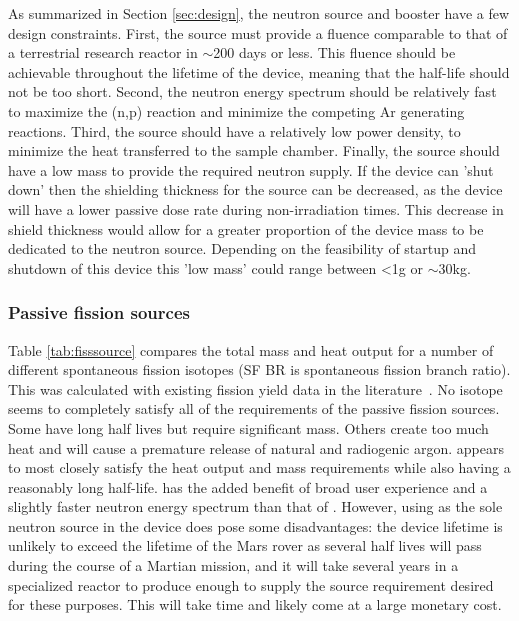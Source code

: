 \documentclass{mc2015}
\begin{document}
As summarized in Section \ref{sec:design}, the neutron source and booster have a few design constraints. First, the source must provide a fluence comparable to that of a terrestrial research reactor in $\sim$200 days or less. This fluence should be achievable throughout the lifetime of the device, meaning that the half-life should not be too short. Second, the neutron energy spectrum should be relatively fast to maximize the (n,p) reaction and minimize the competing Ar generating reactions. Third, the source should have a relatively low power density, to minimize the heat transferred to the sample chamber. Finally, the source should have a low mass to provide the required neutron supply. If the device can 'shut down' then the shielding thickness for the source can be decreased, as the device will have a lower passive dose rate during non-irradiation times. This decrease in shield thickness would allow for a greater proportion of the device mass to be dedicated to the neutron source. Depending on the feasibility of startup and shutdown of this device this 'low mass' could range between <1g or $\sim$30kg. 

\subsubsection{Passive fission sources}

Table \ref{tab:fisssource} compares the total mass and heat output for a number of different spontaneous fission isotopes (SF BR is spontaneous fission branch ratio). This was calculated with existing fission yield data in the literature~\cite{england_evaluation_1995, axton_neutron_1985}.
No isotope seems to completely satisfy all of the requirements of the passive fission sources. Some have long half lives but require significant mass. Others create too much heat and will cause a premature release of natural and radiogenic argon.  appears to most closely satisfy the heat output and mass requirements while also having a reasonably long half-life.  has the added benefit of broad user experience \cite{martin_production_2000} and a slightly faster neutron energy spectrum than that of  \cite{hjalmar_energy_1955}. However, using  as the sole neutron source in the device does pose some disadvantages: the device lifetime is unlikely to exceed the lifetime of the Mars rover as several half lives will pass during the course of a Martian mission, and it will take several years in a specialized reactor to produce enough  to supply the source requirement desired for these purposes. This will take time and likely come at a large monetary cost. 
\end{document}
